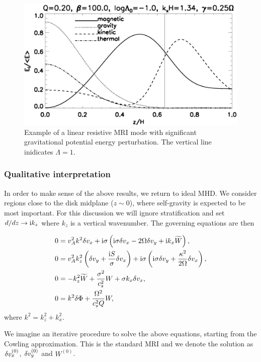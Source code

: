 \begin{figure}
  \includegraphics[width=\linewidth]{figures/result_resis_sg}
  \caption{Example of a linear resistive MRI mode with significant
    gravitational potential energy perturbation.  The vertical line
    inidicates $\Lambda=1$.  
    \label{mri_massive_resis}}
\end{figure}




\subsubsection{Qualitative interpretation} 
In order to make sense of the above results, we return to ideal MHD. 
We consider regions close to the disk midplane ($z\sim 0$), where
self-gravity is expected to be most important. For this discussion we
will ignore stratification and set $d/dz\to \mathrm{i} k_z$ where $k_z$ is
a vertical wavenumber. The governing equations are then

\begin{align}
  &  0= v_A^2k^2\delta v_x + \mathrm{i}\sigma\left(\mathrm{i}\sigma \delta v_x - 2\Omega\delta v_y + \mathrm{i} k_x \widetilde{W}\right),\label{simp1}\\
  &  0= v_A^2k_z^2\left(\delta v_y + \frac{\mathrm{i} S
  }{\sigma}\delta v_x\right) + \mathrm{i}\sigma\left(\mathrm{i}\sigma\delta v_y +
  \frac{\kappa^2}{2\Omega}\delta v_x\right),\label{simp2}\\
  & 0 = -k_z^2\widetilde{W} + \frac{\sigma^2}{c_s^2}W + \sigma k_x \delta v_x, \label{simp3}\\
  & 0 = k^2\delta \Phi + \frac{\Omega^2}{c_s^2Q}W,\label{simp4}
\end{align}
where $k^2 = k_z^2 + k_x^2$. 

We imagine an iterative procedure to solve the above equations,
starting from the Cowling approximation. %
This is the standard MRI and we denote the solution as
$\delta v_x^{(0)}$, $\delta v_y^{(0)}$ and $W^{(0)}$. 

